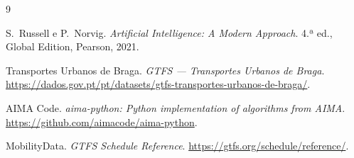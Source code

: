 \documentclass[11pt,a4paper]{article}
\begin{document}




\begin{thebibliography}{9}

S.~Russell e P.~Norvig.
\newblock \emph{Artificial Intelligence: A Modern Approach}.
\newblock 4.ª ed., Global Edition, Pearson, 2021.

Transportes Urbanos de Braga.
\newblock \emph{GTFS --- Transportes Urbanos de Braga}.
\newblock \url{https://dados.gov.pt/pt/datasets/gtfs-transportes-urbanos-de-braga/}.

AIMA Code.
\newblock \emph{aima-python: Python implementation of algorithms from AIMA}.
\newblock \url{https://github.com/aimacode/aima-python}.

MobilityData.
\newblock \emph{GTFS Schedule Reference}.
\newblock \url{https://gtfs.org/schedule/reference/}.

\end{thebibliography}
\end{document}

